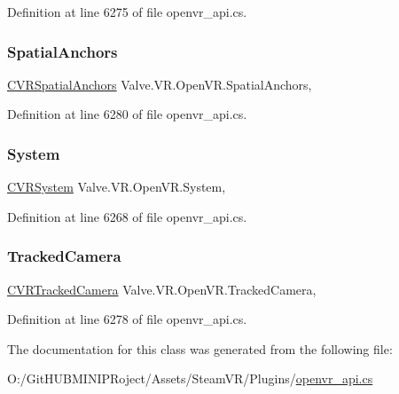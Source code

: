 Definition at line 6275 of file openvr\+\_\+api.\+cs.

\mbox{\label{class_valve_1_1_v_r_1_1_open_v_r_aa0a20f8a24534d4d134f1e86ab9ac1ec}} 
\subsubsection{\texorpdfstring{SpatialAnchors}{SpatialAnchors}}
{\footnotesize\ttfamily \mbox{\hyperlink{class_valve_1_1_v_r_1_1_c_v_r_spatial_anchors}{C\+V\+R\+Spatial\+Anchors}} Valve.\+V\+R.\+Open\+V\+R.\+Spatial\+Anchors\hspace{0.3cm}{\ttfamily [static]}, {\ttfamily [get]}}



Definition at line 6280 of file openvr\+\_\+api.\+cs.

\mbox{\label{class_valve_1_1_v_r_1_1_open_v_r_a6aafa4a25425620225098ded82a045c0}} 
\subsubsection{\texorpdfstring{System}{System}}
{\footnotesize\ttfamily \mbox{\hyperlink{class_valve_1_1_v_r_1_1_c_v_r_system}{C\+V\+R\+System}} Valve.\+V\+R.\+Open\+V\+R.\+System\hspace{0.3cm}{\ttfamily [static]}, {\ttfamily [get]}}



Definition at line 6268 of file openvr\+\_\+api.\+cs.

\mbox{\label{class_valve_1_1_v_r_1_1_open_v_r_a5ea08ced399257a11cd8ebc9efebfa1f}} 
\subsubsection{\texorpdfstring{TrackedCamera}{TrackedCamera}}
{\footnotesize\ttfamily \mbox{\hyperlink{class_valve_1_1_v_r_1_1_c_v_r_tracked_camera}{C\+V\+R\+Tracked\+Camera}} Valve.\+V\+R.\+Open\+V\+R.\+Tracked\+Camera\hspace{0.3cm}{\ttfamily [static]}, {\ttfamily [get]}}



Definition at line 6278 of file openvr\+\_\+api.\+cs.



The documentation for this class was generated from the following file\+:\begin{DoxyCompactItemize}
\item 
O\+:/\+Git\+H\+U\+B\+M\+I\+N\+I\+P\+Roject/\+Assets/\+Steam\+V\+R/\+Plugins/\mbox{\hyperlink{openvr__api_8cs}{openvr\+\_\+api.\+cs}}\end{DoxyCompactItemize}
